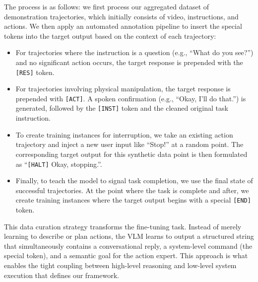 The process is as follows: we first process our aggregated dataset of demonstration trajectories, which initially consists of video, instructions, and actions. We then apply an automated annotation pipeline to insert the special tokens into the target output based on the context of each trajectory:
\begin{itemize}
    \item For trajectories where the instruction is a question (e.g., ``What do you see?'') and no significant action occurs, the target response is prepended with the \texttt{[RES]} token.
    \item For trajectories involving physical manipulation, the target response is prepended with \texttt{[ACT]}. A spoken confirmation (e.g., ``Okay, I'll do that.'') is generated, followed by the \texttt{[INST]} token and the cleaned original task instruction.
    \item To create training instances for interruption, we take an existing action trajectory and inject a new user input like ``Stop!'' at a random point. The corresponding target output for this synthetic data point is then formulated as ``\texttt{[HALT]} Okay, stopping.''.
    \item Finally, to teach the model to signal task completion, we use the final state of successful trajectories. At the point where the task is complete and after, we create training instances where the target output begins with a special \texttt{[END]} token.
\end{itemize}
This data curation strategy transforms the fine-tuning task. Instead of merely learning to describe or plan actions, the VLM learns to output a structured string that simultaneously contains a conversational reply, a system-level command (the special token), and a semantic goal for the action expert. This approach is what enables the tight coupling between high-level reasoning and low-level system execution that defines our framework.


